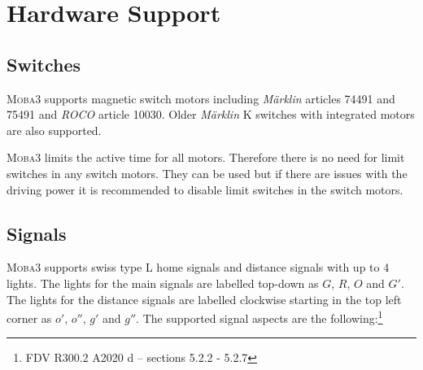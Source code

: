\documentclass{scrreprt}
\begin{document}
\chapter{Hardware Support}
\section{Switches}
\textsc{Moba3} supports magnetic switch motors including \emph{Märklin} articles 74491 and 75491 and \emph{ROCO} article 10030. Older \emph{Märklin} K switches with integrated motors are also supported.

\textsc{Moba3} limits the active time for all motors.
Therefore there is no need for limit switches in any switch motors.
They can be used but if there are issues with the driving power it is recommended to disable limit switches in the switch motors.

\section{Signals}
\textsc{Moba3} supports swiss type L home signals and distance signals with up to 4 lights.
The lights for the main signals are labelled top-down as $G$, $R$, $O$ and $G'$.
The lights for the distance signals are labelled clockwise starting in the top left corner as $o'$, $o''$, $g'$ and $g''$.
The supported signal aspects are the following:\footnote{FDV R300.2 A2020 d -- sections 5.2.2 - 5.2.7}
\end{document}
